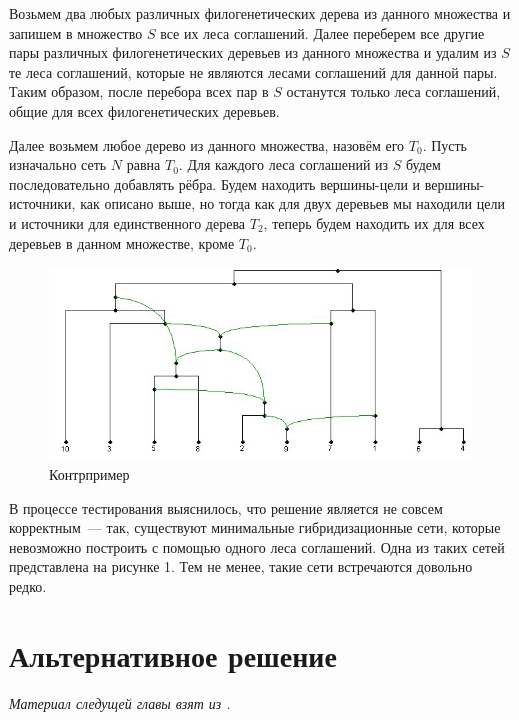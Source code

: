 \documentclass[14pt]{matmex-diploma-custom}
\begin{document}
        Возьмем два любых различных филогенетических дерева из данного множества и запишем в множество $S$ все их леса соглашений. Далее переберем все другие пары различных филогенетических деревьев из данного множества и удалим из $S$ те леса соглашений, которые не являются лесами соглашений для данной пары. Таким образом, после перебора всех пар в $S$ останутся только леса соглашений, общие для всех филогенетических деревьев.
        
        Далее возьмем любое дерево из данного множества, назовём его $T_0$. Пусть изначально сеть $N$ равна $T_0$. Для каждого леса соглашений из $S$ будем последовательно добавлять рёбра. Будем находить вершины-цели и вершины-источники, как описано выше, но тогда как для двух деревьев мы находили цели и источники для единственного дерева $T_2$, теперь будем находить их для всех деревьев в данном множестве, кроме $T_0$.
        
        \begin{figure}[H]
        \label{Контрпример}
        \centering
        \includegraphics{countertest.png}
        \caption{Контрпример}
        \end{figure}
        
        
        
        
        В процессе тестирования выяснилось, что решение является не совсем корректным~--- так, существуют минимальные гибридизационные сети, которые невозможно построить с помощью одного леса соглашений. Одна из таких сетей представлена на рисунке 1. Тем не менее, такие сети встречаются довольно редко.
        
    
\newpage
    
\section{Альтернативное решение}

    \textit{Материал следущей главы взят из \cite{Wu2013}.}
    
\end{document}
